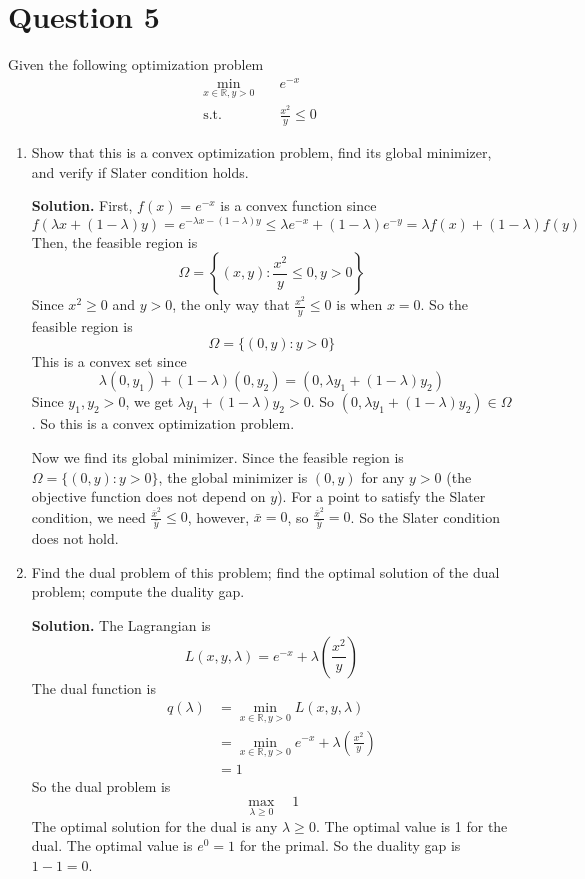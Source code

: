 \documentclass{article}
\begin{document}
\section{Question 5}
Given the following optimization problem 
\begin{align*}
    \min_{x \in \mathbb R, y > 0} \quad & e^{-x} \\
    \text{s.t.} \quad & \frac{x^2}{y} \leq 0
\end{align*}
\begin{enumerate}
    \item Show that this is a convex optimization problem, find its global minimizer, and verify if Slater condition holds.
    
    \textbf{Solution.}
    First, $f(x) = e^{-x}$ is a convex function since $$f(\lambda x + (1-\lambda)y) = e^{-\lambda x - (1-\lambda)y} \leq \lambda e^{-x} + (1-\lambda)e^{-y} = \lambda f(x) + (1-\lambda)f(y)$$
    Then, the feasible region is $$\Omega = \left\{(x, y): \frac{x^2}{y} \leq 0, y > 0\right\}$$ Since $x^2 \geq 0$ and $y > 0$, the only way that $\frac{x^2}{y} \leq 0$ is when $x = 0$. So the feasible region is $$\Omega = \{(0, y): y > 0\}$$ This is a convex set since $$\lambda(0, y_1) + (1-\lambda)(0, y_2) = (0, \lambda y_1 + (1-\lambda)y_2)$$ Since $y_1, y_2 > 0$, we get $\lambda y_1 + (1-\lambda)y_2 > 0$. So $(0, \lambda y_1 + (1-\lambda)y_2) \in \Omega$. So this is a convex optimization problem.

    \bigskip Now we find its global minimizer. Since the feasible region is $\Omega = \{(0, y): y > 0\}$, the global minimizer is $(0, y)$ for any $y > 0$ (the objective function does not depend on $y$). For a point to satisfy the Slater condition, we need $\frac{\bar x^2}{\bar y} \leq 0$, however, $\bar x = 0$, so $\frac{\bar x^2}{\bar y} = 0$. So the Slater condition does not hold.
    \item Find the dual problem of this problem; find the optimal solution of the dual problem; compute the duality gap.
    
    \textbf{Solution.}
    The Lagrangian is $$L(x, y, \lambda) = e^{-x} + \lambda\left(\frac{x^2}{y}\right)$$ The dual function is 
    \begin{align*}
        q(\lambda) &= \min_{x \in \mathbb R, y > 0} L(x, y, \lambda) \\
        &= \min_{x \in \mathbb R, y > 0} e^{-x} + \lambda\left(\frac{x^2}{y}\right) \\
        &= 1 \tag*{since $x$ is always 0}  
    \end{align*}
    So the dual problem is 
    $$\max_{\lambda \geq 0} \quad 1$$
    The optimal solution for the dual is any $\lambda \geq 0$. The optimal value is 1 for the dual. The optimal value is $e^{0} = 1$ for the primal. So the duality gap is $1 - 1 = 0$.
\end{enumerate}
\end{document}
